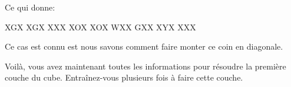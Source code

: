Ce qui donne:
 
\begin{center}
    \RubikFaceRight%
 	{X}{G}{X}%
 	{X}{G}{X}%
 	{X}{X}{X}
 	\RubikFaceFront%
 	{X}{O}{X}%
 	{X}{O}{X}%
 	{W}{X}{X}
 	\RubikFaceDown%
 	{G}{X}{X}%
 	{X}{Y}{X}%
 	{X}{X}{X}
\end{center} 


Ce cas est connu est nous savons comment faire monter ce coin en diagonale.

Voilà, vous avez maintenant toutes les informations pour résoudre la première
couche du cube. Entraînez-vous plusieurs fois à faire cette couche.
